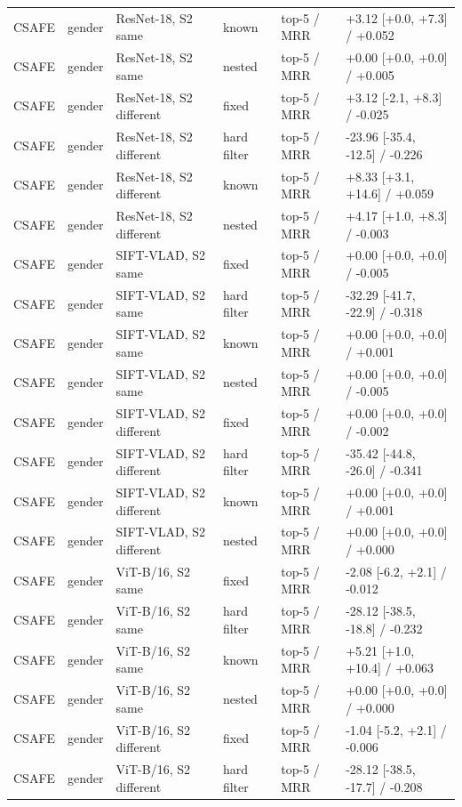 {\begin{longtable}{llllll}
CSAFE & gender & ResNet-18, S2 same & known & top-5 / MRR & +3.12 [+0.0, +7.3] / +0.052 \\
CSAFE & gender & ResNet-18, S2 same & nested & top-5 / MRR & +0.00 [+0.0, +0.0] / +0.005 \\
CSAFE & gender & ResNet-18, S2 different & fixed & top-5 / MRR & +3.12 [-2.1, +8.3] / -0.025 \\
CSAFE & gender & ResNet-18, S2 different & hard filter & top-5 / MRR & -23.96 [-35.4, -12.5] / -0.226 \\
CSAFE & gender & ResNet-18, S2 different & known & top-5 / MRR & +8.33 [+3.1, +14.6] / +0.059 \\
CSAFE & gender & ResNet-18, S2 different & nested & top-5 / MRR & +4.17 [+1.0, +8.3] / -0.003 \\
CSAFE & gender & SIFT-VLAD, S2 same & fixed & top-5 / MRR & +0.00 [+0.0, +0.0] / -0.005 \\
CSAFE & gender & SIFT-VLAD, S2 same & hard filter & top-5 / MRR & -32.29 [-41.7, -22.9] / -0.318 \\
CSAFE & gender & SIFT-VLAD, S2 same & known & top-5 / MRR & +0.00 [+0.0, +0.0] / +0.001 \\
CSAFE & gender & SIFT-VLAD, S2 same & nested & top-5 / MRR & +0.00 [+0.0, +0.0] / -0.005 \\
CSAFE & gender & SIFT-VLAD, S2 different & fixed & top-5 / MRR & +0.00 [+0.0, +0.0] / -0.002 \\
CSAFE & gender & SIFT-VLAD, S2 different & hard filter & top-5 / MRR & -35.42 [-44.8, -26.0] / -0.341 \\
CSAFE & gender & SIFT-VLAD, S2 different & known & top-5 / MRR & +0.00 [+0.0, +0.0] / +0.001 \\
CSAFE & gender & SIFT-VLAD, S2 different & nested & top-5 / MRR & +0.00 [+0.0, +0.0] / +0.000 \\
CSAFE & gender & ViT-B/16, S2 same & fixed & top-5 / MRR & -2.08 [-6.2, +2.1] / -0.012 \\
CSAFE & gender & ViT-B/16, S2 same & hard filter & top-5 / MRR & -28.12 [-38.5, -18.8] / -0.232 \\
CSAFE & gender & ViT-B/16, S2 same & known & top-5 / MRR & +5.21 [+1.0, +10.4] / +0.063 \\
CSAFE & gender & ViT-B/16, S2 same & nested & top-5 / MRR & +0.00 [+0.0, +0.0] / +0.000 \\
CSAFE & gender & ViT-B/16, S2 different & fixed & top-5 / MRR & -1.04 [-5.2, +2.1] / -0.006 \\
CSAFE & gender & ViT-B/16, S2 different & hard filter & top-5 / MRR & -28.12 [-38.5, -17.7] / -0.208 \\

\end{longtable}}
